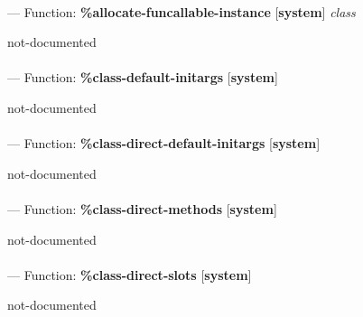 \paragraph{}
\label{SYSTEM:ALLOCATE-FUNCALLABLE-INSTANCE}
--- Function: \textbf{\%allocate-funcallable-instance} [\textbf{system}] \textit{class}

\begin{adjustwidth}{5em}{5em}
not-documented
\end{adjustwidth}

\paragraph{}
\label{SYSTEM:CLASS-DEFAULT-INITARGS}
--- Function: \textbf{\%class-default-initargs} [\textbf{system}] \textit{}

\begin{adjustwidth}{5em}{5em}
not-documented
\end{adjustwidth}

\paragraph{}
\label{SYSTEM:CLASS-DIRECT-DEFAULT-INITARGS}
--- Function: \textbf{\%class-direct-default-initargs} [\textbf{system}] \textit{}

\begin{adjustwidth}{5em}{5em}
not-documented
\end{adjustwidth}

\paragraph{}
\label{SYSTEM:CLASS-DIRECT-METHODS}
--- Function: \textbf{\%class-direct-methods} [\textbf{system}] \textit{}

\begin{adjustwidth}{5em}{5em}
not-documented
\end{adjustwidth}

\paragraph{}
\label{SYSTEM:CLASS-DIRECT-SLOTS}
--- Function: \textbf{\%class-direct-slots} [\textbf{system}] \textit{}

\begin{adjustwidth}{5em}{5em}
not-documented
\end{adjustwidth}

